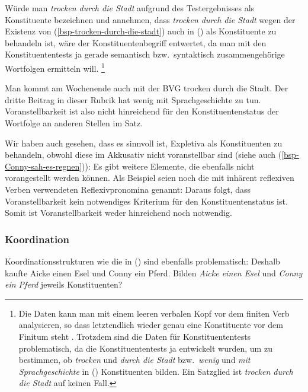 Würde man \emph{trocken durch die Stadt} aufgrund des Testergebnisses als Konstituente bezeichnen
und annehmen, dass \emph{trocken durch die Stadt} wegen der Existenz von (\ref{bsp-trocken-durch-die-stadt})
auch in () als Konstituente zu behandeln ist, 
wäre der Konstituentenbegriff entwertet, da man mit den Konstituententests ja gerade semantisch
bzw.\ syntaktisch zusammengehörige Wortfolgen ermitteln will.%
\footnote{
  Die Daten kann man mit einem leeren verbalen Kopf vor dem finiten Verb analysieren,
  so dass letztendlich wieder genau eine Konstituente vor dem Finitum steht \citep{Mueller2005d}.
  Trotzdem sind die Daten für Konstituententests problematisch, da die Konstituententests
  ja entwickelt wurden, um zu bestimmen, ob \zb \emph{trocken} und \emph{durch die Stadt}
  bzw.\ \emph{wenig} und \emph{mit Sprachgeschichte} in () Konstituenten bilden. Ein
  Satzglied ist \emph{trocken durch die Stadt} auf keinen Fall.%
}

\eal
\ex Man kommt am Wochenende auch mit der BVG trocken durch die Stadt.
\ex Der dritte Beitrag in dieser Rubrik hat wenig mit Sprachgeschichte zu tun.
\zl
Voranstellbarkeit ist also nicht hinreichend für den Konstituentenstatus der Wortfolge an anderen
Stellen im Satz.

Wir haben auch gesehen, dass es sinnvoll ist, Expletiva als Konstituenten zu behandeln,
obwohl diese im Akkusativ nicht voranstellbar sind (siehe auch (\ref{bsp-Conny-sah-es-regnen})):
\eal
{}
\zl
Es gibt weitere Elemente, die ebenfalls nicht vorangestellt werden können. Als Beispiel
seien noch die mit inhärent reflexiven Verben verwendeten Reflexivpronomina genannt:
\eal
{}
\zl
Daraus folgt, dass Voranstellbarkeit kein notwendiges Kriterium für den Konstituentenstatus
ist. Somit ist Voranstellbarkeit weder hinreichend noch notwendig.


\subsubsection{Koordination}

Koordinationsstrukturen wie die in () sind ebenfalls problematisch:
\ea
\label{ex-gapping}
Deshalb kaufte Aicke einen Esel und Conny ein Pferd.
\z
Bilden \emph{Aicke einen Esel} und \emph{Conny ein Pferd} jeweils Konstituenten?

